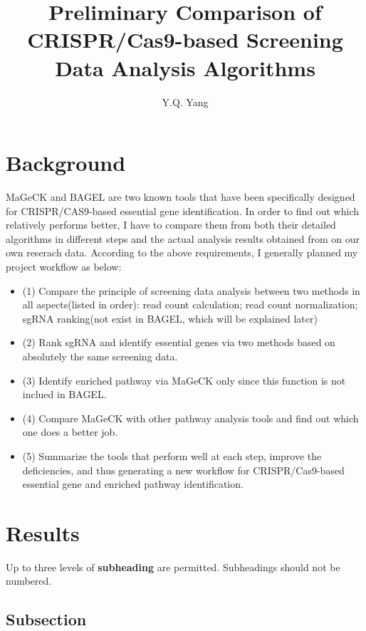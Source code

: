 \documentclass[fleqn,10pt]{wlscirep}
\title{Preliminary Comparison of CRISPR/Cas9-based Screening Data Analysis Algorithms}
\author[1,*]{Y.Q. Yang}
\begin{document}
\flushbottom
\maketitle

\thispagestyle{empty}

\section*{Background}

MaGeCK and BAGEL are two known tools that have been specifically designed for CRISPR/CAS9-based essential gene identification. In order to find out which relatively performs better, I have to compare them from both their detailed algorithms in different steps and the actual analysis results obtained from on our own reserach data.  According to the above requirements, I generally planned my project workflow as below:

\begin{itemize}
    \item (1) Compare the principle of screening data analysis between two methods in all aspects(listed in order):
        \subitem read count calculation;
        \subitem read count normalization;
        \subitem sgRNA ranking(not exist in BAGEL, which will be explained later)
    \item (2) Rank sgRNA and identify essential genes via two methods based on absolutely the same screening data.
    \item (3) Identify enriched pathway via MaGeCK only since this function is not inclued in BAGEL.
    \item (4) Compare MaGeCK with other pathway analysis tools and find out which one does a better job.
    \item (5) Summarize the tools that perform well at each step, improve the deficiencies, and thus generating a new workflow for CRISPR/Cas9-based essential gene and enriched pathway identification.
    \end{itemize}

\section*{Results}

Up to three levels of \textbf{subheading} are permitted. Subheadings should not be numbered.

\subsection*{Subsection}
\end{document}
